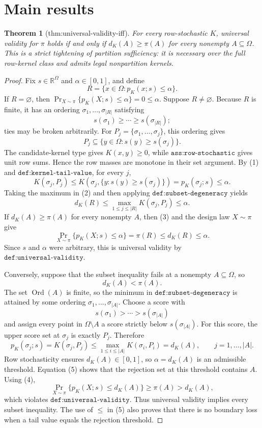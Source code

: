 \documentclass{article}
\newtheorem{theorem}{Theorem}
\begin{document}
\section{Main results}

\begin{theorem}[thm:universal-validity-iff]\label{thm:universal-validity-iff}
For every row-stochastic \(K\), universal validity for \(\pi\) holds if and only if \(d_K(A)\geq\pi(A)\) for every nonempty \(A\subseteq\Omega\). This is a strict tightening of partition sufficiency: it is necessary over the full row-kernel class and admits legal nonpartition kernels.
\end{theorem}
\begin{proof}
Fix \(s\in\mathbb R^{\Omega}\) and \(\alpha\in[0,1]\), and define
\[
R=\{x\in\Omega:p_K(x;s)\leq\alpha\}.
\]
If \(R=\varnothing\), then
\(\Pr_{X\sim\pi}\{p_K(X;s)\leq\alpha\}=0\leq\alpha\).  Suppose
\(R\neq\varnothing\).  Because \(R\) is finite, it has an ordering
\(\sigma_1,\ldots,\sigma_{|R|}\) satisfying
\[
s(\sigma_1)\geq\cdots\geq s(\sigma_{|R|});
\]
ties may be broken arbitrarily.  For
\(P_j=\{\sigma_1,\ldots,\sigma_j\}\), this ordering gives
\[
P_j\subseteq\{y\in\Omega:s(y)\geq s(\sigma_j)\}.
\tag{1}
\]
The candidate-kernel type gives \(K(x,y)\geq0\), while
\(\texttt{ass:row-stochastic}\) gives unit row sums.  Hence the row masses are
monotone in their set argument.  By (1) and
\(\texttt{def:kernel-tail-value}\), for every \(j\),
\[
K(\sigma_j,P_j)
\leq K\!\left(\sigma_j,\{y:s(y)\geq s(\sigma_j)\}\right)
=p_K(\sigma_j;s)
\leq\alpha.
\tag{2}
\]
Taking the maximum in (2) and then applying
\(\texttt{def:subset-degeneracy}\) yields
\[
d_K(R)
\leq\max_{1\leq j\leq |R|}K(\sigma_j,P_j)
\leq\alpha.
\tag{3}
\]
If \(d_K(A)\geq\pi(A)\) for every nonempty \(A\), then (3) and the design
law \(X\sim\pi\) give
\[
\Pr_{X\sim\pi}\{p_K(X;s)\leq\alpha\}
=\pi(R)
\leq d_K(R)
\leq\alpha.
\]
Since \(s\) and \(\alpha\) were arbitrary, this is universal validity by
\(\texttt{def:universal-validity}\).

Conversely, suppose that the subset inequality fails at a nonempty
\(A\subseteq\Omega\), so
\[
d_K(A)<\pi(A).
\tag{4}
\]
The set \(\operatorname{Ord}(A)\) is finite, so the minimum in
\(\texttt{def:subset-degeneracy}\) is attained by some ordering
\(\sigma_1,\ldots,\sigma_{|A|}\).  Choose a score with
\[
s(\sigma_1)>\cdots>s(\sigma_{|A|})
\]
and assign every point in \(\Omega\setminus A\) a score strictly below
\(s(\sigma_{|A|})\).  For this score, the upper score set at \(\sigma_j\) is
exactly \(P_j\).  Therefore
\[
p_K(\sigma_j;s)
=K(\sigma_j,P_j)
\leq\max_{1\leq i\leq |A|}K(\sigma_i,P_i)
=d_K(A),
\qquad j=1,\ldots,|A|.
\tag{5}
\]
Row stochasticity ensures \(d_K(A)\in[0,1]\), so
\(\alpha=d_K(A)\) is an admissible threshold.  Equation (5) shows that the
rejection set at this threshold contains \(A\).  Using (4),
\[
\Pr_{X\sim\pi}\{p_K(X;s)\leq d_K(A)\}
\geq\pi(A)
>d_K(A),
\]
which violates \(\texttt{def:universal-validity}\).  Thus universal validity
implies every subset inequality.  The use of \(\leq\) in (5) also proves that
there is no boundary loss when a tail value equals the rejection threshold.


\end{proof}
\end{document}
